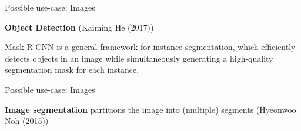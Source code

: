 
\begin{frame} {Possible use-case: Images}

\begin{figure}
\centering
{}
\end{figure}
  
\textbf{Object Detection} (Kaiming He (2017))

Mask R-CNN is a general framework for instance segmentation, which efficiently detects objects in an image while simultaneously generating a high-quality segmentation mask for each instance.
\end{frame}



\begin{frame} {Possible use-case: Images}

\begin{figure}
\centering
{}
\end{figure}
  
\textbf{Image segmentation} partitions the image into (multiple) segments (Hyeonwoo Noh (2015))

\end{frame}

